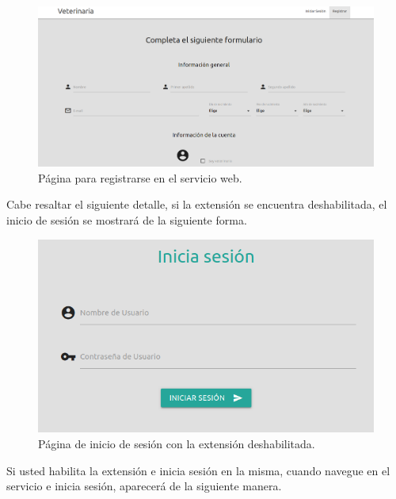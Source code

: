 \documentclass[12pt, a4paper, titlepage]{report}
\begin{document}
	\begin{figure}[H]
		\begin{center}	
		\includegraphics[width=14cm]{./imagenes/Ejecucion/UI_nuevoUsuarioServicioWeb.png}
		\caption{Página para registrarse en el servicio web.}
		\label{fig:registroNuevoUsuario}
		\end{center}
	\end{figure}
	
	Cabe resaltar el siguiente detalle, si la extensión se encuentra deshabilitada, el inicio de sesión se mostrará de la siguiente forma.
    
    \begin{figure}[H]
		\begin{center}	
		\includegraphics[width=12cm]{./imagenes/Ejecucion/UI_inicioSesionComun.png}
		\caption{Página de inicio de sesión con la extensión deshabilitada.}
		\label{fig:inicioSesionComun}
		\end{center}
	\end{figure}
	
	Si usted habilita la extensión e inicia sesión en la misma, cuando navegue en el servicio e inicia sesión, aparecerá de la siguiente manera.
	
\end{document}

